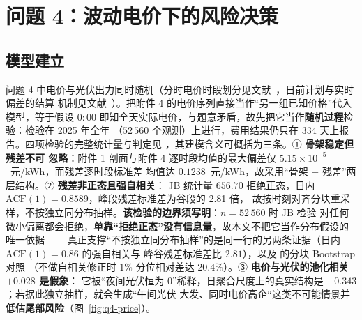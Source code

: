 
\section{问题 4：波动电价下的风险决策}\label{chap:q4}

\subsection{模型建立}

问题 4 中电价与光伏出力同时随机（分时电价时段划分见文献~\cite{ref1093}，日前计划与实时偏差的结算
机制见文献~\cite{ref1217}）。把附件 4 的电价序列直接当作“另一组已知价格”代入模型，等于假设
\(0{:}00\) 即知全天实际电价，与题意矛盾，故先把它当作\textbf{随机过程}检验：检验在 2025 年全年
（\(52\,560\) 个观测）上进行，费用结果仍只在 334 天上报告。四项检验的完整统计量与判定见
，其建模含义可概括为三条。① \textbf{骨架稳定但残差不可
忽略}：附件 1 剖面与附件 4 逐时段均值的最大偏差仅 \(5.15\times10^{-5}\)~元/kWh，而残差逐时段标准差
均值达 \(0.1238\)~元/kWh，故采用“骨架 \(+\) 残差”两层结构。② \textbf{残差非正态且强自相关}：
JB 统计量 \(656.70\) 拒绝正态，日内 \(\mathrm{ACF}(1)=0.8589\)，峰段残差标准差为谷段的 2.81 倍，
故按时刻对齐分块重采样，不按独立同分布抽样。\textbf{该检验的边界须写明}：\(n=52\,560\) 时 JB 检验
对任何微小偏离都会拒绝，\textbf{单靠“拒绝正态”没有信息量}，故本文不把它当作分布假设的唯一依据——
真正支撑“不按独立同分布抽样”的是同一行的另两条证据（日内 \(\mathrm{ACF}(1)=0.86\) 的强自相关与
峰谷残差标准差比 \(2.81\)），以及  的分块 Bootstrap 对照
（不做自相关修正时
\(1\%\) 分位相对差达 \(20.4\%\)）。③ \textbf{电价与光伏的池化相关 \(+0.028\) 是假象}：
它被“夜间光伏恒为 0”稀释，日聚合尺度上的真实结构是 \(-0.343\)；若据此独立抽样，就会生成“午间光伏
大发、同时电价高企“这类不可能情景并\textbf{低估尾部风险}（图~\ref{fig:q4-price}）。

